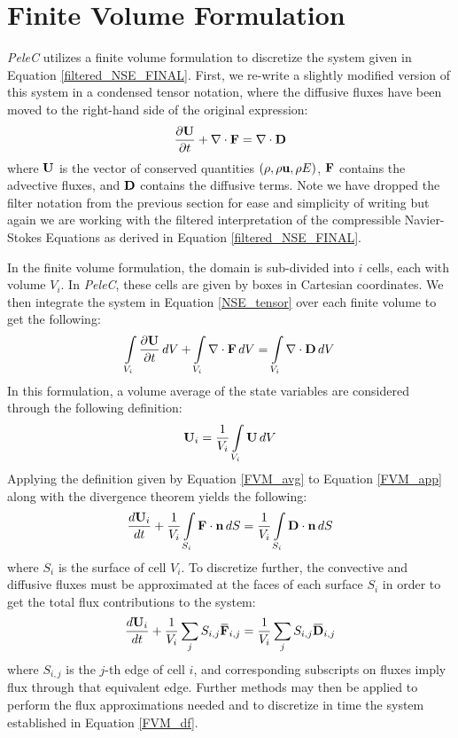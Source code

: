 \section{Finite Volume Formulation} \label{FVM_section}
\textit{PeleC} utilizes a finite volume formulation \cite{} to discretize the system given in Equation \ref{filtered_NSE_FINAL}. First, we re-write a slightly modified version of this system in a condensed tensor notation, where the diffusive fluxes have been moved to the right-hand side of the original expression: 
\begin{equation} \label{NSE_tensor}
\dfrac{\partial \vb{U}}{\partial t} + \nabla \cdot \vb{F} = \nabla \cdot \vb{D}
\end{equation}
where $\vb{U}$ is the vector of conserved quantities $(\rho, \rho \vb{u}, \rho E)$, $\vb{F}$ contains the advective fluxes, and $\vb{D}$ contains the diffusive terms. Note we have dropped the filter notation from the previous section for ease and simplicity of writing but again we are working with the filtered interpretation of the compressible Navier-Stokes Equations as derived in Equation \ref{filtered_NSE_FINAL}. 

In the finite volume formulation, the domain is sub-divided into $i$ cells, each with volume $V_i$. In \textit{PeleC}, these cells are given by boxes in Cartesian coordinates. We then integrate the system in Equation \ref{NSE_tensor} over each finite volume to get the following:
\begin{equation} \label{FVM_app}
\int\limits_{V_i} \dfrac{\partial \vb{U}}{\partial t}\, dV + \int\limits_{V_i} \nabla \cdot \vb{F}\, dV = \int\limits_{V_i} \nabla \cdot \vb{D}\, dV
\end{equation}
In this formulation, a volume average of the state variables are considered through the following definition:
\begin{equation} \label{FVM_avg}
\vb{U}_i = \dfrac{1}{V_i} \int\limits_{V_i} \vb{U} \, dV
\end{equation} 
Applying the definition given by Equation \ref{FVM_avg} to Equation \ref{FVM_app} along with the divergence theorem yields the following:
\begin{equation} \label{FVM}
\dfrac{d\vb{U}_i}{dt} + \dfrac{1}{V_i} \int\limits_{S_i} \vb{F}\cdot \vb{n}\, dS = \dfrac{1}{V_i} \int\limits_{S_i} \vb{D} \cdot \vb{n} \, dS 
\end{equation}
where $S_i$ is the surface of cell $V_i$. To discretize further, the convective and diffusive fluxes must be approximated at the faces of each surface $S_i$ in order to get the total flux contributions to the system:
\begin{equation} \label{FVM_df}
\dfrac{d\vb{U}_i}{dt} +  \dfrac{1}{V_i} \sum\limits_j S_{i,j} \overbar{\vb{F}}_{i,j} =  \dfrac{1}{V_i}\sum\limits_j S_{i,j} \overbar{\vb{D}}_{i,j}
\end{equation}
where $S_{i,j}$ is the $j$-th edge of cell $i$, and corresponding subscripts on fluxes imply flux through that equivalent edge. Further methods may then be applied to perform the flux approximations needed and to discretize in time the system established in Equation \ref{FVM_df}. 

